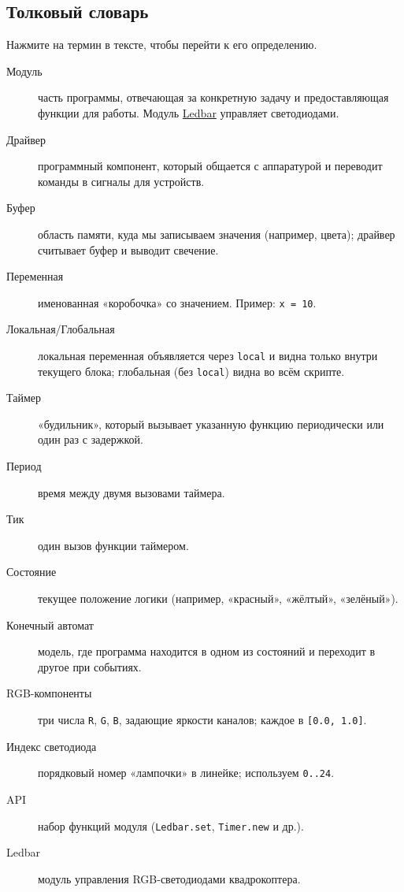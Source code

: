 \subsection{Толковый словарь}
Нажмите на термин в тексте, чтобы перейти к его определению.
\begin{description}
  \item[\hypertarget{term:module}{Модуль}] часть программы, отвечающая за конкретную задачу и предоставляющая функции для работы. Модуль \hyperlink{term:ledbar}{Ledbar} управляет светодиодами.
  \item[\hypertarget{term:driver}{Драйвер}] программный компонент, который общается с аппаратурой и переводит команды в сигналы для устройств.
  \item[\hypertarget{term:buffer}{Буфер}] область памяти, куда мы записываем значения (например, цвета); драйвер считывает буфер и выводит свечение.
  \item[\hypertarget{term:variable}{Переменная}] именованная «коробочка» со значением. Пример: \verb|x = 10|.
  \item[\hypertarget{term:scope}{Локальная/Глобальная}] локальная переменная объявляется через \verb|local| и видна только внутри текущего блока; глобальная (без \verb|local|) видна во всём скрипте.
  \item[\hypertarget{term:timer}{Таймер}] «будильник», который вызывает указанную функцию периодически или один раз с задержкой.
  \item[\hypertarget{term:period}{Период}] время между двумя вызовами таймера.
  \item[\hypertarget{term:tick}{Тик}] один вызов функции таймером.
  \item[\hypertarget{term:state}{Состояние}] текущее положение логики (например, «красный», «жёлтый», «зелёный»).
  \item[\hypertarget{term:automaton}{Конечный автомат}] модель, где программа находится в одном из состояний и переходит в другое при событиях.
  \item[\hypertarget{term:rgb}{RGB-компоненты}] три числа \verb|R|, \verb|G|, \verb|B|, задающие яркости каналов; каждое в \verb|[0.0, 1.0]|.
  \item[\hypertarget{term:index}{Индекс светодиода}] порядковый номер «лампочки» в линейке; используем \verb|0..24|.
  \item[\hypertarget{term:api}{API}] набор функций модуля (\verb|Ledbar.set|, \verb|Timer.new| и др.).
  \item[\hypertarget{term:ledbar}{Ledbar}] модуль управления RGB-светодиодами квадрокоптера.
\end{description}

